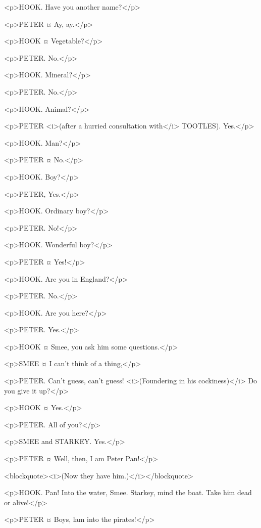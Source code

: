 <p>HOOK. Have you another name?</p>

<p>PETER ¤
Ay, ay.</p>

<p>HOOK ¤
Vegetable?</p>

<p>PETER. No.</p>

<p>HOOK. Mineral?</p>

<p>PETER. No.</p>

<p>HOOK. Animal?</p>

<p>PETER <i>(after a hurried consultation with</i> TOOTLES). Yes.</p>

<p>HOOK. Man?</p>

<p>PETER ¤
No.</p>

<p>HOOK. Boy?</p>

<p>PETER, Yes.</p>

<p>HOOK. Ordinary boy?</p>

<p>PETER. No!</p>

<p>HOOK. Wonderful boy?</p>

<p>PETER ¤
Yes!</p>

<p>HOOK. Are you in England?</p>

<p>PETER. No.</p>

<p>HOOK. Are you here?</p>

<p>PETER. Yes.</p>

<p>HOOK ¤
Smee, you ask him some questions.</p>

<p>SMEE ¤
I can't think of a thing,</p>

<p>PETER. Can't guess, can't guess! <i>(Foundering in his cockiness)</i> Do you give it up?</p>

<p>HOOK ¤
Yes.</p>

<p>PETER. All of you?</p>

<p>SMEE and STARKEY. Yes.</p>

<p>PETER ¤
Well, then, I am Peter Pan!</p>

<blockquote><i>(Now they have him.)</i></blockquote>

<p>HOOK. Pan! Into the water, Smee. Starkey, mind the boat. Take him dead or alive!</p>

<p>PETER ¤
Boys, lam into the pirates!</p>

